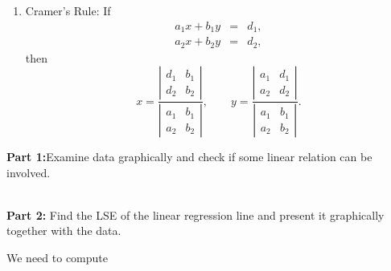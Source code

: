 \begin{enumerate}
\begin{enumerate}
		\item Cramer's Rule: If
		\begin{eqnarray*}
			a_{1}x+b_{1}y &=&d_{1}, \\
			a_{2}x+b_{2}y &=&d_{2},
		\end{eqnarray*}%
		then%
		\begin{equation*}
		x=\frac{\left\vert
			\begin{array}{cc}
			d_{1} & b_{1} \\
			d_{2} & b_{2}%
			\end{array}%
			\right\vert }{\left\vert
			\begin{array}{cc}
			a_{1} & b_{1} \\
			a_{2} & b_{2}%
			\end{array}%
			\right\vert },\qquad y=\frac{\left\vert
			\begin{array}{cc}
			a_{1} & d_{1} \\
			a_{2} & d_{2}%
			\end{array}%
			\right\vert }{\left\vert
			\begin{array}{cc}
			a_{1} & b_{1} \\
			a_{2} & b_{2}%
			\end{array}%
			\right\vert }.
		\end{equation*}
	\end{enumerate}
\end{enumerate}



\noindent\textbf{Part 1:}Examine data graphically and check if some linear relation can be involved.

\\
\bigskip
\noindent\textbf{Part 2: }Find the LSE of the linear regression line and present it graphically together with the data.

We need to compute

